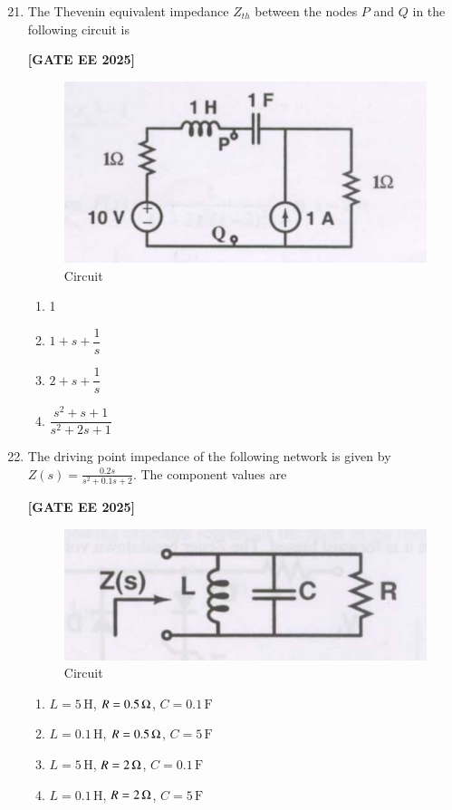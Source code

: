 \documentclass[12pt]{article}
\begin{document}
\begin{enumerate}[leftmargin=*, label=\textbf{Q.\arabic*:}]
\setcounter{enumi}{20}

\item The Thevenin equivalent impedance $Z_{th}$ between the nodes $P$ and $Q$ in the following circuit is
 
\noindent \textbf{[GATE EE 2025]}
\begin{figure}[H]\centering
\includegraphics[width=0.7\columnwidth]{figs/q21.png}
\caption{Circuit}
\label{fig:q21}
\end{figure}
\begin{multicols}{4}
\begin{enumerate}
  \item 1
  \item $1+s+\dfrac{1}{s}$
  \item $2+s+\dfrac{1}{s}$
  \item $\dfrac{s^2+s+1}{s^2+2s+1}$
\end{enumerate}
\end{multicols}

\item The driving point impedance of the following network is given by $Z(s)=\frac{0.2s}{s^2+0.1s+2}$. The component values are
 
\noindent \textbf{[GATE EE 2025]}
\begin{figure}[H]\centering
\includegraphics[width=0.7\columnwidth]{figs/q22.png}
\caption{Circuit}
\label{fig:q22}
\end{figure}

\begin{multicols}{2}
\begin{enumerate}
  \item $L=5\,\text{H}$, $R=0.5\,\ohm$, $C=0.1\,\text{F}$
  \item $L=0.1\,\text{H}$, $R=0.5\,\ohm$, $C=5\,\text{F}$
  \item $L=5\,\text{H}$, $R=2\,\ohm$, $C=0.1\,\text{F}$
  \item $L=0.1\,\text{H}$, $R=2\,\ohm$, $C=5\,\text{F}$
\end{enumerate}
\end{multicols}


\end{enumerate}
\end{document}
